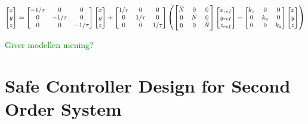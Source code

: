 \begin{equation}
\small
\dot{\begin{bmatrix}
	x\\y\\z
	\end{bmatrix}} =
\begin{bmatrix}
-1/\tau & 0 & 0\\0 & -1/\tau & 0 \\ 0 & 0 & -1/\tau
\end{bmatrix}
\begin{bmatrix}
x\\y\\z
\end{bmatrix} +
\begin{bmatrix}
1/\tau& 0 & 0 \\ 0& 1/\tau & 0 \\0& 0& 1/\tau
\end{bmatrix} 
\left(
\begin{bmatrix}
\bar{N} & 0 & 0 \\0 & \bar{N} & 0 \\0& 0& \bar{N}
\end{bmatrix}
\begin{bmatrix}
x_{ref}\\y_{ref}\\z_{ref}
\end{bmatrix}
-
\begin{bmatrix}
k_x & 0 & 0 \\0 & k_y & 0 \\0& 0&  k_z
\end{bmatrix}
\begin{bmatrix}
x\\y\\z
\end{bmatrix}
\right)
\end{equation}

\textcolor{green}{Giver modellen mening?}

\section{Safe Controller Design for Second Order System}